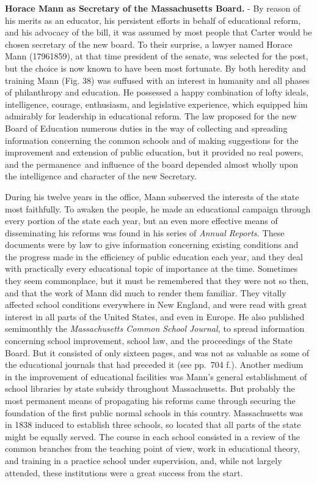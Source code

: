 \documentclass[]{book}
\begin{document}
\textbf{Horace Mann as Secretary of the Massachusetts Board.} - By reason of his merits as an educator, his persistent efforts in behalf of educational reform, and his advocacy of the bill, it was assumed by most people that Carter would be chosen secretary of the new board. To their surprise, a lawyer named Horace Mann (17961859), at that time president of the senate, was selected for the post, but the choice is now known to have been most fortunate. By both heredity and training Mann (Fig. 38) was suffused with an interest in humanity and all phases of philanthropy and education. He possessed a happy combination of lofty ideals, intelligence, courage, enthusiasm, and legislative experience, which equipped him admirably for leadership in educational reform. The law proposed for the new Board of Education numerous duties in the way of collecting and spreading information concerning the common schools and of making suggestions for the improvement and extension of public education, but it provided no real powers, and the permanence~and influence of the board depended almost wholly upon the intelligence and character of the new Secretary.

During his twelve years in the office, Mann subserved the interests of the state most faithfully. To awaken the people, he made an educational campaign through every portion of the state each year, but an even more effective means of disseminating his reforms was found in his series of \emph{Annual Reports.} These documents were by law to give information concerning existing conditions and the progress made in the efficiency of public education each year, and they deal with practically every educational topic of importance at the time. Sometimes they seem commonplace, but it must be remembered that they were not so then, and that the work of Mann did much to render them familiar. They vitally affected school conditions everywhere in New England, and were read with great interest in all parts of the United States, and even in Europe. He also published semimonthly the \emph{Massachusetts Common School Journal,} to spread information concerning school improvement, school law, and the proceedings of the State Board. But it consisted of only sixteen pages, and was not as valuable as some of the educational journals that had preceded it (see pp.~704 f.). Another medium in the improvement of educational facilities was Mann's general establishment of school libraries by state subsidy throughout Massachusetts. But probably the most permanent means of propagating his reforms came through securing the foundation of the first public normal schools in this country. Massachusetts was in 1838 induced to establish three schools, so located that all parts of the state might be equally served. The course in each school consisted in a review of the common branches from the teaching point of view, work in educational theory, and training in a practice school under supervision, and, while not largely attended, these institutions were a great success from the start.
\end{document}
